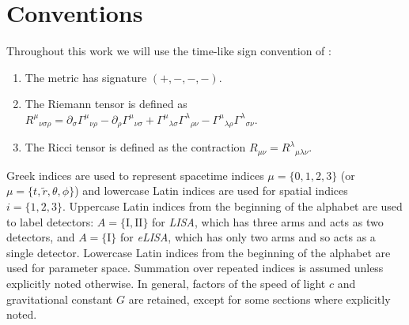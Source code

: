 \section{Conventions}

Throughout this work we will use the time-like sign convention of \citet{Landau1975}:
\begin{enumerate}
\item The metric has signature $(+,-,-,-)$.
\item The Riemann tensor is defined as ${R^\mu}_{\nu\sigma\rho} = \partial_\sigma {\Gamma^\mu}_{\nu\rho} - \partial_\rho {\Gamma^\mu}_{\nu\sigma} + {\Gamma^\mu}_{\lambda\sigma}{\Gamma^\lambda}_{\rho\nu} - {\Gamma^\mu}_{\lambda\rho}{\Gamma^\lambda}_{\sigma\nu}$.
\item The Ricci tensor is defined as the contraction $R_{\mu\nu} = {R^\lambda}_{\mu\lambda\nu}$.
\end{enumerate}
Greek indices are used to represent spacetime indices $\mu = \{0,1,2,3\}$ (or $\mu = \{t,\widetilde{r},\theta,\phi\}$) and lowercase Latin indices are used for spatial indices $i = \{1,2,3\}$. Uppercase Latin indices from the beginning of the alphabet are used to label detectors: $A = \{\mathrm{I}, \mathrm{II}\}$ for \textit{LISA}, which has three arms and acts as two detectors, and $A = \{\mathrm{I}\}$ for \textit{eLISA}, which has only two arms and so acts as a single detector. Lowercase Latin indices from the beginning of the alphabet are used for parameter space. Summation over repeated indices is assumed unless explicitly noted otherwise. In general, factors of the speed of light $c$ and gravitational constant $G$ are retained, except for some sections where explicitly noted. 

